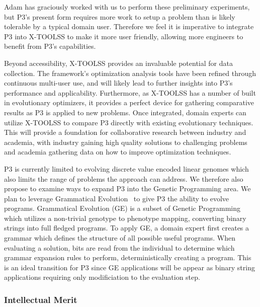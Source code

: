 \documentclass{article}
\newcommand{\includegraphicsfit}[1]
{\texttt{[image: \#1]}}
\begin{document}
Adam has graciously worked with us to perform these preliminary
experiments, but P3's present form requires more work to setup a
problem than is likely tolerable by a typical domain user. 
Therefore we feel it is imperative to integrate P3 into X-TOOLSS to make it more user friendly,
allowing more engineers to benefit from P3's capabilities.

Beyond accessibility, X-TOOLSS provides an invaluable potential for data collection.
The framework's optimization analysis tools have been refined through continuous multi-user use, and
will likely lead to further insights into P3's performance and applicability.  Furthermore, as X-TOOLSS has a number
of built in evolutionary optimizers, it provides a perfect device for gathering comparative results
as P3 is applied to new problems.  Once integrated, domain experts can utilize
X-TOOLSS to compare P3 directly with existing evolutionary techniques.
This will provide a foundation
for collaborative research between industry and academia, with industry gaining high quality solutions
to challenging problems and academia gathering data on how to improve optimization techniques.


P3 is currently limited to evolving discrete value encoded linear
genomes which also limits the range of problems the approach can address.
We therefore also propose to examine ways to expand P3 into the
Genetic Programming area. We plan to leverage Grammatical Evolution~\cite{oneill:2001:grammatical}
to give P3 the ability to evolve programs.  Grammatical Evolution (GE) is a subset
of Genetic Programming which utilizes a non-trivial genotype to phenotype mapping, converting
binary strings into full fledged programs.  To apply GE, a domain expert first creates a
grammar which defines the structure of all possible useful programs.  When evaluating a
solution, bits are read from the individual to determine which grammar expansion rules to perform,
deterministically creating a program.  This is an ideal transition for
P3 since GE applications will be appear as binary string
applications requiring 
only modificiation to the evaluation step.

\subsubsection*{Intellectual Merit}
\end{document}

